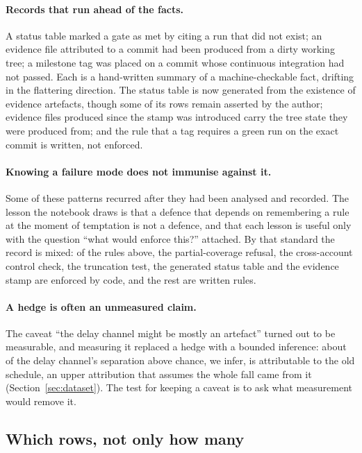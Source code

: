 \paragraph{Records that run ahead of the facts.} A status table marked a gate as met by citing a
run that did not exist; an evidence file attributed to a commit had been produced from a dirty
working tree; a milestone tag was placed on a commit whose continuous integration had not passed.
Each is a hand-written summary of a machine-checkable fact, drifting in the flattering direction.
The status table is now generated from the existence of evidence artefacts, though some of its rows
remain asserted by the author; evidence files produced since the stamp was introduced carry the tree
state they were produced from; and the rule that a tag requires a green run on the exact commit is
written, not enforced.

\paragraph{Knowing a failure mode does not immunise against it.} Some of these patterns recurred
after they had been analysed and recorded. The lesson the notebook draws is that a defence that
depends on remembering a rule at the moment of temptation is not a defence, and that each lesson is
useful only with the question ``what would enforce this?'' attached. By that standard the record is
mixed: of the rules above, the partial-coverage refusal, the cross-account control check, the
truncation test, the generated status table and the evidence stamp are enforced by code, and the
rest are written rules.

\paragraph{A hedge is often an unmeasured claim.} The caveat ``the delay channel might be mostly an
artefact'' turned out to be measurable, and measuring it replaced a hedge with a bounded inference: about
\nEventDelayShare{} of the delay channel's separation above chance, we infer, is attributable to the old
schedule, an upper attribution that assumes the whole fall came from it (Section~\ref{sec:dataset}). The test for keeping a
caveat is to ask what measurement would remove it.

\subsection{Which rows, not only how many}
\label{sec:rowselection}

